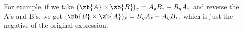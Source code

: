 For example, if we take $(\zb{A}\times\zb{B})_x=  A_yB_z - B_yA_z$ and reverse the A's and B's, we
get $(\zb{B}\times\zb{A})_x=  B_yA_z - A_yB_z$, which is just the negative of
the original expression.



